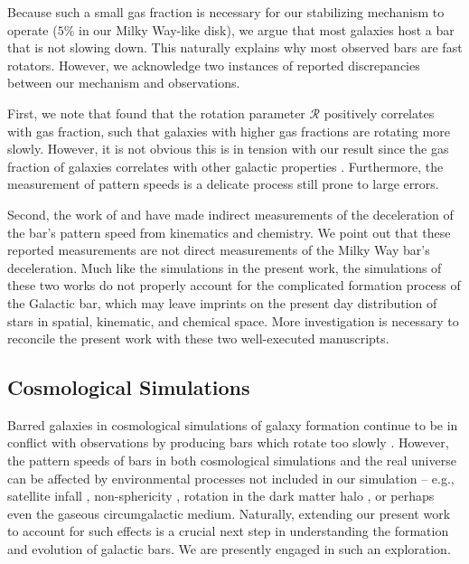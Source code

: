 \documentclass[fleqn,usenatbib]{mnras}
\newcommand{\Rot}{\ensuremath{\mathcal{R}}}
\begin{document}
Because such a small gas fraction is necessary for our stabilizing mechanism to
operate ($5\%$ in our Milky Way-like disk), we argue that most galaxies host a
bar that is not slowing down. This naturally explains why most observed bars are
fast rotators. However, we acknowledge two instances of reported discrepancies
between our mechanism and observations.

First, we note that \citet{2020MNRAS.491.3655G} found that the rotation
parameter \Rot{} positively correlates with gas fraction, such that galaxies
with higher gas fractions are rotating more slowly. However, it is not obvious
this is in tension with our result since the gas fraction of galaxies correlates
with other galactic properties \citep{2009ARAA..47..159B}. Furthermore, the
measurement of pattern speeds is a delicate process still prone to large errors.

Second, the work of \citet{2021MNRAS.500.4710C} and \citet{2021MNRAS.505.2412C}
have made indirect measurements of the deceleration of the bar's pattern speed
from kinematics and chemistry. We point out that these reported measurements are
not direct measurements of the Milky Way bar's deceleration. Much like the
simulations in the present work, the simulations of these two works do not
properly account for the complicated formation process of the Galactic bar,
which may leave imprints on the present day distribution of stars in spatial,
kinematic, and chemical space. More investigation is necessary to reconcile the
present work with these two well-executed manuscripts.

\subsection{Cosmological Simulations}
Barred galaxies in cosmological simulations of galaxy formation continue to be
in conflict with observations by producing bars which rotate too slowly
\citep{2017MNRAS.469.1054A, 2019MNRAS.483.2721P, 2021AA...650L..16F}. However,
the pattern speeds of bars in both cosmological simulations and the real
universe can be affected by environmental processes not included in our
simulation -- e.g., satellite infall \citep{2011Natur.477..301P}, non-sphericity
\citep{2013MNRAS.429.1949A}, rotation in the dark matter halo
\citep{2013MNRAS.434.1287S, 2014ApJ...783L..18L, 2018MNRAS.476.1331C,
2019MNRAS.488.5788C}, or perhaps even the gaseous circumgalactic medium.
Naturally, extending our present work to account for such effects is a crucial
next step in understanding the formation and evolution of galactic bars. We are
presently engaged in such an exploration.
\end{document}
